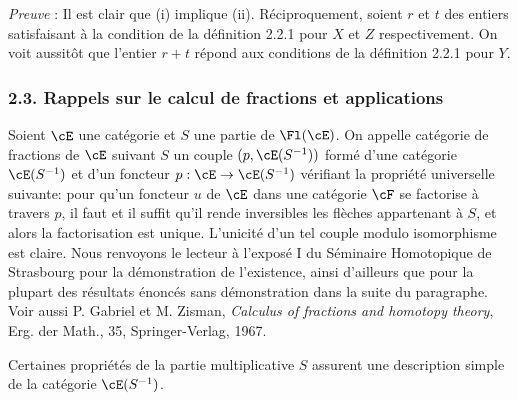 \emph{Preuve} : Il est clair que (i) implique (ii). Réciproquement, soient $r$ et $t$ des entiers satisfaisant à la condition de la définition 2.2.1 pour $X$ et $Z$ respectivement. On voit aussitôt que l'entier $r+t$ répond aux conditions de la définition 2.2.1 pour $Y$.

\subsubsection*{2.3. Rappels sur le calcul de fractions et applications}
Soient $\cE$ une catégorie et $S$ une partie de $\Fl(\cE)$. On appelle catégorie de fractions de $\cE$ suivant $S$ un couple $(p,\cE(S^{-1}))$ formé d'une catégorie $\cE(S^{-1})$ et d'un foncteur $p:\cE\to\cE(S^{-1})$ vérifiant la propriété universelle suivante: pour qu'un foncteur $u$ de $\cE$ dans une catégorie $\cF$ se factorise à travers $p$, il faut et il suffit qu'il rende inversibles les flèches appartenant à $S$, et alors la factorisation est unique. L'unicité d'un tel couple modulo isomorphisme est claire. Nous renvoyons le lecteur à l'exposé I du Séminaire Homotopique de Strasbourg pour la démonstration de l'existence, ainsi d'ailleurs que pour la plupart des résultats énoncés sans démonstration dans la suite du paragraphe. Voir aussi P. Gabriel et M. Zisman, \emph{Calculus of fractions and homotopy theory}, Erg. der Math., 35, Springer-Verlag, 1967.

Certaines propriétés de la partie multiplicative $S$ assurent une description simple de la catégorie $\cE(S^{-1})$.

